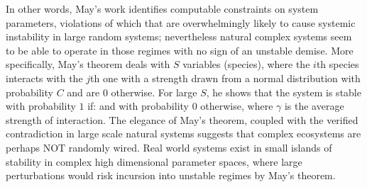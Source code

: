 \documentclass[onecolumn, compsoc,11pt]{IEEEtran}
\begin{document}
In other words, May's work identifies  computable constraints on system parameters, violations of which  that are overwhelmingly likely to cause systemic instability in large random systems; nevertheless natural complex systems seem to be able to operate in those regimes with no sign of an unstable demise.
%
More specifically, May's theorem deals with  $S$ variables (species), where the $i$th species interacts with the $j$th one with a strength  drawn  from a normal distribution
 with probability $C$ and are $0$ otherwise.
For large $S$, he shows that the system is stable with probability $1$ if:
\noindent and with probability 0 otherwise, where $\gamma$ is the average strength of interaction.
The elegance of May's theorem, coupled with the  verified contradiction in large scale natural systems suggests that  complex ecosystems are perhaps  NOT  randomly wired. Real world  systems exist in small islands of stability in complex high dimensional parameter spaces, where  large perturbations would risk incursion into unstable regimes by  May's theorem.
\end{document}
